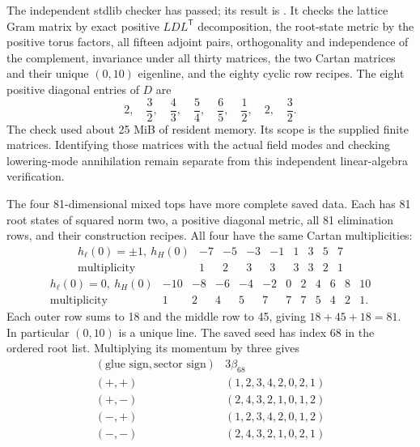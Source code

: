 The independent stdlib checker
 has passed; its result is
. It checks the lattice Gram matrix
by exact positive $LDL^{\mathsf T}$ decomposition, the root-state
metric by the positive torus factors, all fifteen adjoint pairs,
orthogonality and independence of the complement, invariance under
all thirty matrices, the two Cartan matrices and their unique
$(0,10)$ eigenline, and the eighty cyclic row recipes. The eight
positive diagonal entries of $D$ are
\[
 2,\quad\frac32,\quad\frac43,\quad\frac54,\quad
 \frac65,\quad\frac12,\quad2,\quad\frac32.
\]
The check used about 25 MiB of resident memory. Its scope is
the supplied finite matrices. Identifying those matrices with the
actual field modes and checking lowering-mode annihilation remain
separate from this independent linear-algebra verification.

The four 81-dimensional mixed tops have more complete saved data.
Each has 81 root states of squared norm two, a positive diagonal
metric, all 81 elimination rows, and their construction recipes.
All four have the same Cartan multiplicities:
\[
\begin{array}{c|rrrrrrrr}
 h_{\ell}(0)=\pm1,\ h_H(0)&-7&-5&-3&-1&1&3&5&7\\\hline
 \text{multiplicity}&1&2&3&3&3&3&2&1
\end{array}
\]
\[
\begin{array}{c|rrrrrrrrrrr}
 h_{\ell}(0)=0,\ h_H(0)&-10&-8&-6&-4&-2&0&2&4&6&8&10\\\hline
 \text{multiplicity}&1&2&4&5&7&7&7&5&4&2&1 .
\end{array}
\]
Each outer row sums to 18 and the middle row to 45, giving
$18+45+18=81$. In particular $(0,10)$ is a unique line.
The saved seed has index 68 in the ordered root list. Multiplying
its momentum by three gives
\[
\begin{array}{c|c}
 (\text{glue sign},\text{sector sign})&3\beta_{68}\\\hline
 (+,+)&(1,2,3,4,2,0,2,1)\\
 (+,-)&(2,4,3,2,1,0,1,2)\\
 (-,+)&(1,2,3,4,2,0,1,2)\\
 (-,-)&(2,4,3,2,1,0,2,1)
\end{array}
\]

